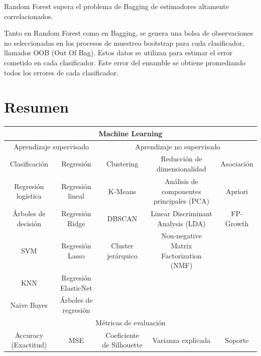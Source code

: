 \documentclass[a4paper, 12pt]{book}
\begin{document}
Random Forest supera el problema de Bagging de estimadores altamente correlacionados.

Tanto en Random Forest como en Bagging, se genera una bolsa de observaciones no seleccionadas en los procesos de muestreo bootstrap para cada clasificador, llamados OOB (Out Of Bag). Estos datos se utilizan para estimar el error cometido en cada clasificador. Este error del ensamble se obtiene promediando todos los errores de cada clasificador.

\newpage
\section{Resumen}
\begin{table}[H]
	\resizebox{15cm}{!} {
	\begin{tabular}{|ccccc|}
		\hline
		\multicolumn{5}{|c|}{Machine Learning} \\ \hline
		\multicolumn{2}{|c|}{Aprendizaje supervisado} & \multicolumn{3}{c|}{Aprendizaje no supervisado} \\ \hline
		\multicolumn{1}{|c|}{Clasificación} & \multicolumn{1}{c|}{Regresión} & \multicolumn{1}{c|}{Clustering} & \multicolumn{1}{c|}{Reducción de dimensionalidad} & Asociación \\ \hline
		\multicolumn{1}{|c|}{Regresión logística} & \multicolumn{1}{c|}{Regresión lineal} & \multicolumn{1}{c|}{K-Means} & \multicolumn{1}{c|}{Análisis de componentes principales (PCA)} & Apriori \\ \hline
		\multicolumn{1}{|c|}{Árboles de decisión} & \multicolumn{1}{c|}{Regresión Ridge} & \multicolumn{1}{c|}{DBSCAN} & \multicolumn{1}{c|}{Linear Discriminant Analysis (LDA)} & FP-Growth \\ \hline
		\multicolumn{1}{|c|}{SVM} & \multicolumn{1}{c|}{Regresión Lasso} & \multicolumn{1}{c|}{Cluster jerárquico} & \multicolumn{1}{c|}{Non-negative Matrix Factorization (NMF)} &  \\ \hline
		\multicolumn{1}{|c|}{KNN} & \multicolumn{1}{c|}{Regresión ElasticNet} & \multicolumn{1}{c|}{} & \multicolumn{1}{c|}{} &  \\ \hline
		\multicolumn{1}{|c|}{Naive Bayes} & \multicolumn{1}{c|}{Árboles de regresión} & \multicolumn{1}{c|}{} & \multicolumn{1}{c|}{} &  \\ \hline
		\multicolumn{5}{|c|}{Métricas de evaluación} \\ \hline
		\multicolumn{1}{|c|}{Accuracy (Exactitud)} & \multicolumn{1}{c|}{MSE} & \multicolumn{1}{c|}{Coeficiente de Silhouette} & \multicolumn{1}{c|}{Varianza explicada} & Soporte \\ \hline

\end{tabular}}
\end{table}
\end{document}
